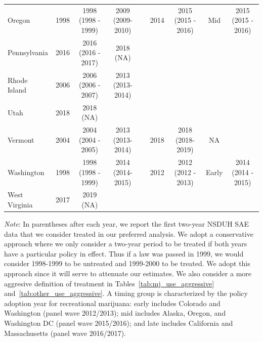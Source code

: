 \documentclass[12pt]{article}%
\begin{document}
\begin{appendices}
\begin{table}[htp!]
\begin{adjustbox}{width=\textwidth}
\begin{tabular}{@{}lccclcccc@{}}
Oregon        & 1998       & 1998 (1998 - 1999)                         & 2009 (2009-2010)                          &  & 2014       & 2015 (2015 - 2016) & Mid          & 2015 (2015 - 2016)          \\
Pennsylvania  & 2016       & 2016 (2016 - 2017)                         & 2018 (NA)                                 &  &            &                    &              &                             \\
Rhode Island  & 2006       & 2006 (2006 - 2007)                         & 2013 (2013-2014)                          &  &            &                    &              &                             \\
Utah          & 2018       & 2018 (NA)                                  &                                           &  &            &                    &              &                             \\
Vermont       & 2004       & 2004 (2004 - 2005)                         & 2013 (2013-2014)                          &  & 2018       & 2018 (2018- 2019)  & NA           &                             \\
Washington    & 1998       & 1998 (1998 - 1999)                         & 2014 (2014-2015)                          &  & 2012       & 2012 (2012 - 2013) & Early        & 2014 (2014 - 2015)          \\
West Virginia & 2017       & 2019 (NA)                                  &                                           &  &            &                    &              &                             \\ \bottomrule
\end{tabular}
\label{tab:adoption_table}
\end{adjustbox}
{\footnotesize
    \begin{justify}
        \emph{Note}:
        In parentheses after each year, we report the first two-year NSDUH SAE data  that we consider treated in our preferred analysis.
        We adopt a conservative approach where we only consider a two-year period to be treated if both years have a particular policy in effect.
        Thus if a law was passed in 1999, we would consider 1998-1999 to be untreated and 1999-2000 to be treated.
        We adopt this approach since it will serve to attenuate our estimates.
        We also consider a more aggresive definition of treatment in Tables~\ref{tab:mj_use_aggressive} and~\ref{tab:other_use_aggressive}.
        A timing group is characterized by the policy adoption year for recreational marijuana: early includes Colorado and Washington (panel wave 2012/2013); mid includes Alaska, Oregon, and Washington DC (panel wave 2015/2016); and late includes California and Massachusetts (panel wave 2016/2017). \\

\end{justify}}
\end{table}
\end{appendices}
\end{document}
